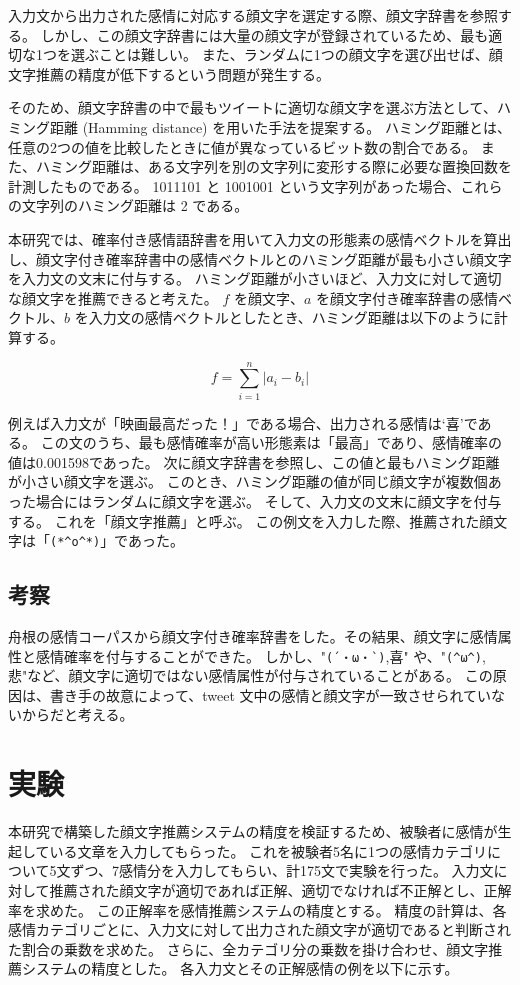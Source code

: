 \documentclass[11pt,a4j]{jsarticle}
\begin{document}
入力文から出力された感情に対応する顔文字を選定する際、顔文字辞書を参照する。
しかし、この顔文字辞書には大量の顔文字が登録されているため、最も適切な1つを選ぶことは難しい。
また、ランダムに1つの顔文字を選び出せば、顔文字推薦の精度が低下するという問題が発生する。

そのため、顔文字辞書の中で最もツイートに適切な顔文字を選ぶ方法として、ハミング距離 (Hamming distance) を用いた手法を提案する。
ハミング距離とは、任意の2つの値を比較したときに値が異なっているビット数の割合である。
また、ハミング距離は、ある文字列を別の文字列に変形する際に必要な置換回数を計測したものである。
1011101 と 1001001 という文字列があった場合、これらの文字列のハミング距離は 2 である。

本研究では、確率付き感情語辞書を用いて入力文の形態素の感情ベクトルを算出し、顔文字付き確率辞書中の感情ベクトルとのハミング距離が最も小さい顔文字を入力文の文末に付与する。
ハミング距離が小さいほど、入力文に対して適切な顔文字を推薦できると考えた。
$f$ を顔文字、$a$ を顔文字付き確率辞書の感情ベクトル、$b$ を入力文の感情ベクトルとしたとき、ハミング距離は以下のように計算する。

\[
  f=\sum_{i=1}^{n} |a_i-b_i|
\]

例えば入力文が「映画最高だった！」である場合、出力される感情は`喜'である。
この文のうち、最も感情確率が高い形態素は「最高」であり、感情確率の値は0.001598であった。
次に顔文字辞書を参照し、この値と最もハミング距離が小さい顔文字を選ぶ。
このとき、ハミング距離の値が同じ顔文字が複数個あった場合にはランダムに顔文字を選ぶ。
そして、入力文の文末に顔文字を付与する。
これを「顔文字推薦」と呼ぶ。
この例文を入力した際、推薦された顔文字は「\verb|(*^o^*)|」であった。

  \subsection{考察}
舟根の感情コーパスから顔文字付き確率辞書をした。その結果、顔文字に感情属性と感情確率を付与することができた。
しかし、"\verb|(´・ω・`)|,喜" や、"\verb|(^ω^)|,悲"など、顔文字に適切ではない感情属性が付与されていることがある。
この原因は、書き手の故意によって、tweet 文中の感情と顔文字が一致させられていないからだと考える。

\section{実験}\label{sec:experiment}
本研究で構築した顔文字推薦システムの精度を検証するため、被験者に感情が生起している文章を入力してもらった。
これを被験者5名に1つの感情カテゴリについて5文ずつ、7感情分を入力してもらい、計175文で実験を行った。
入力文に対して推薦された顔文字が適切であれば正解、適切でなければ不正解とし、正解率を求めた。
この正解率を感情推薦システムの精度とする。
精度の計算は、各感情カテゴリごとに、入力文に対して出力された顔文字が適切であると判断された割合の乗数を求めた。
さらに、全カテゴリ分の乗数を掛け合わせ、顔文字推薦システムの精度とした。
各入力文とその正解感情の例を以下に示す。
\end{document}

